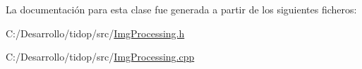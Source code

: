 La documentación para esta clase fue generada a partir de los siguientes ficheros\+:\begin{DoxyCompactItemize}
\item 
C\+:/\+Desarrollo/tidop/src/\hyperlink{_img_processing_8h}{Img\+Processing.\+h}\item 
C\+:/\+Desarrollo/tidop/src/\hyperlink{_img_processing_8cpp}{Img\+Processing.\+cpp}\end{DoxyCompactItemize}

